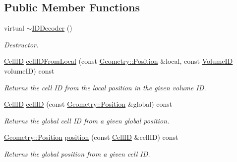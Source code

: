 \subsection*{Public Member Functions}
\begin{DoxyCompactItemize}
\item 
virtual \hyperlink{class_d_d4hep_1_1_d_d_rec_1_1_i_d_decoder_ae33c4d2a1adca58755ef45b8d7c47571}{$\sim$IDDecoder} ()
\begin{DoxyCompactList}\small\item\em Destructor. \item\end{DoxyCompactList}\item 
\hyperlink{namespace_d_d4hep_1_1_d_d_rec_af5cecc2e566eeaedb430b92df23971d4}{CellID} \hyperlink{class_d_d4hep_1_1_d_d_rec_1_1_i_d_decoder_a6a03404cec542464c5dd2d09e92ee5e4}{cellIDFromLocal} (const \hyperlink{namespace_d_d4hep_1_1_geometry_a55083902099d03506c6db01b80404900}{Geometry::Position} \&local, const \hyperlink{namespace_d_d4hep_1_1_d_d_rec_a5b5fea15b3678944e1aba487a746bdcb}{VolumeID} volumeID) const 
\begin{DoxyCompactList}\small\item\em Returns the cell ID from the local position in the given volume ID. \item\end{DoxyCompactList}\item 
\hyperlink{namespace_d_d4hep_1_1_d_d_rec_af5cecc2e566eeaedb430b92df23971d4}{CellID} \hyperlink{class_d_d4hep_1_1_d_d_rec_1_1_i_d_decoder_a0eb7cd447af5964d4705cb79ffe311b2}{cellID} (const \hyperlink{namespace_d_d4hep_1_1_geometry_a55083902099d03506c6db01b80404900}{Geometry::Position} \&global) const 
\begin{DoxyCompactList}\small\item\em Returns the global cell ID from a given global position. \item\end{DoxyCompactList}\item 
\hyperlink{namespace_d_d4hep_1_1_geometry_a55083902099d03506c6db01b80404900}{Geometry::Position} \hyperlink{class_d_d4hep_1_1_d_d_rec_1_1_i_d_decoder_a2fa7177db38cced4a6f5173a2fc17b4f}{position} (const \hyperlink{namespace_d_d4hep_1_1_d_d_rec_af5cecc2e566eeaedb430b92df23971d4}{CellID} \&cellID) const 
\begin{DoxyCompactList}\small\item\em Returns the global position from a given cell ID. \item\end{DoxyCompactList}\item 

\end{DoxyCompactItemize}
